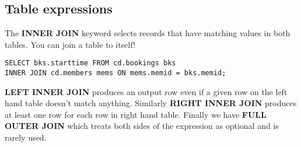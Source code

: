 %

\color{red}
\subsection{Table expressions}
The \textbf{INNER JOIN} keyword selects records that have matching values in both tables.
You can join a table to itself!
\begin{verbatim}
SELECT bks.starttime FROM cd.bookings bks
INNER JOIN cd.members mems ON mems.memid = bks.memid;
\end{verbatim}

\textbf{LEFT INNER JOIN} produces an output row even if a given row on the left hand table doesn't match anything.
Similarly \textbf{RIGHT INNER JOIN} produces at least one row for each row in right hand table.
Finally we have \textbf{FULL OUTER JOIN} which treats both sides of the expression as optional and is rarely used.

%